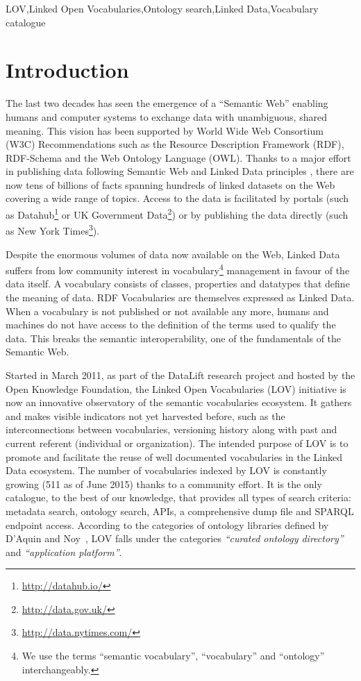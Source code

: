 \documentclass{iosart2c}
\begin{document}
\begin{frontmatter}
\begin{keyword}
LOV\sep Linked Open Vocabularies\sep Ontology search\sep Linked Data\sep Vocabulary catalogue
\end{keyword}

\end{frontmatter}


\section{Introduction}
The last two decades has seen the emergence of a ``Semantic Web'' enabling humans and computer systems to exchange data with unambiguous, shared meaning. This vision has been supported by World Wide Web Consortium (W3C) Recommendations such as the Resource Description Framework (RDF), RDF-Schema and the Web Ontology Language (OWL). Thanks to a major effort in publishing data following Semantic Web and Linked Data principles \cite{timld}, there are now tens of billions of facts spanning hundreds of linked datasets on the Web covering a wide range of topics. Access to the data is facilitated by portals (such as Datahub\footnote{\url{http://datahub.io/}} or UK Government Data\footnote{\url{http://data.gov.uk/}}) or by publishing the data directly (such as New York Times\footnote{\url{http://data.nytimes.com/}}). 

Despite the enormous volumes of data now available on the Web, Linked Data suffers from low community interest in vocabulary\footnote{We use the terms ``semantic vocabulary'', ``vocabulary'' and ``ontology'' interchangeably.} management in favour of the data itself. A vocabulary consists of classes, properties and datatypes that define the meaning of data. RDF Vocabularies are themselves expressed as Linked Data. When a vocabulary is not published or not available any more, humans and machines do not have access to the definition of the terms used to qualify the data. This breaks the semantic interoperability, one of the fundamentals of the Semantic Web. 

Started in March 2011, as part of the DataLift research project \cite{scharffe_2012} and hosted by the Open Knowledge Foundation, the Linked Open Vocabularies (LOV) initiative is now an innovative observatory of the semantic vocabularies ecosystem. It gathers and makes visible indicators not yet harvested before, such as the interconnections between vocabularies, versioning history along with past and current referent (individual or organization). The intended purpose of LOV is to promote and facilitate the reuse of well documented vocabularies in the Linked Data ecosystem. The number of vocabularies indexed by LOV is constantly growing (511 as of June 2015) thanks to a community effort. It is the only catalogue, to the best of our knowledge, that provides all types of search criteria: metadata search, ontology search, APIs, a comprehensive dump file and SPARQL endpoint access. According to the categories of ontology libraries defined by D'Aquin and Noy~\cite{AquinJoWS12}, LOV falls under the categories \textit{``curated ontology directory''}  and \textit{``application platform''}. 
\end{document}
